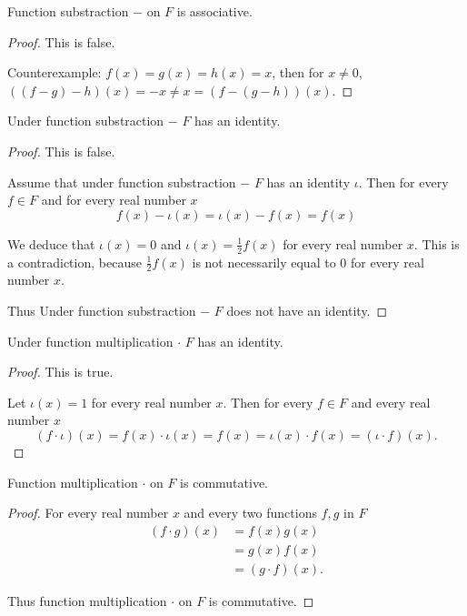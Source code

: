 \begin{exercise}
    Function substraction $-$ on $F$ is associative.
\end{exercise}

\begin{proof}
    This is false.

    Counterexample: $f(x) = g(x) = h(x) = x$, then for $x\ne 0$, $((f - g) - h)(x) = -x \ne x = (f - (g - h))(x)$.
\end{proof}

\begin{exercise}
    Under function substraction $-$ $F$ has an identity.
\end{exercise}

\begin{proof}
    This is false.

    Assume that under function substraction $-$ $F$ has an identity $\iota$. Then for every $f\in F$ and for every real number $x$
    \[
        f(x) - \iota(x) = \iota(x) - f(x) = f(x)
    \]

    We deduce that $\iota(x) = 0$ and $\iota(x) = \frac{1}{2}f(x)$ for every real number $x$. This is a contradiction, because $\frac{1}{2}f(x)$ is not necessarily equal to $0$ for every real number $x$.

    Thus Under function substraction $-$ $F$ does not have an identity.
\end{proof}

\begin{exercise}
    Under function multiplication $\cdot$ $F$ has an identity.
\end{exercise}

\begin{proof}
    This is true.

    Let $\iota(x) = 1$ for every real number $x$. Then for every $f\in F$ and every real number $x$
    \[
        (f\cdot \iota)(x) = f(x)\cdot \iota(x) = f(x) = \iota(x)\cdot f(x) = (\iota\cdot f)(x).
    \]
\end{proof}

\begin{exercise}
    Function multiplication $\cdot$ on $F$ is commutative.
\end{exercise}

\begin{proof}
    For every real number $x$ and every two functions $f, g$ in $F$
    \begin{align*}
        (f\cdot g)(x) & = f(x)g(x)       \\
                      & = g(x)f(x)       \\
                      & = (g\cdot f)(x).
    \end{align*}

    Thus function multiplication $\cdot$ on $F$ is commutative.
\end{proof}

